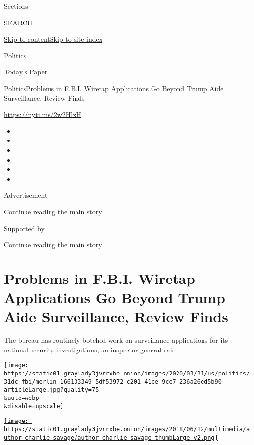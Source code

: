 Sections

SEARCH

\protect\hyperlink{site-content}{Skip to
content}\protect\hyperlink{site-index}{Skip to site index}

\href{https://www.nytimes3xbfgragh.onion/section/politics}{Politics}

\href{https://myaccount.nytimes3xbfgragh.onion/auth/login?response_type=cookie\&client_id=vi}{}

\href{https://www.nytimes3xbfgragh.onion/section/todayspaper}{Today's
Paper}

\href{/section/politics}{Politics}\textbar{}Problems in F.B.I. Wiretap
Applications Go Beyond Trump Aide Surveillance, Review Finds

\url{https://nyti.ms/2w2HlxH}

\begin{itemize}
\item
\item
\item
\item
\item
\item
\end{itemize}

Advertisement

\protect\hyperlink{after-top}{Continue reading the main story}

Supported by

\protect\hyperlink{after-sponsor}{Continue reading the main story}

\hypertarget{problems-in-fbi-wiretap-applications-go-beyond-trump-aide-surveillance-review-finds}{%
\section{Problems in F.B.I. Wiretap Applications Go Beyond Trump Aide
Surveillance, Review
Finds}\label{problems-in-fbi-wiretap-applications-go-beyond-trump-aide-surveillance-review-finds}}

The bureau has routinely botched work on surveillance applications for
its national security investigations, an inspector general said.

\texttt{[image: https://static01.graylady3jvrrxbe.onion/images/2020/03/31/us/politics/31dc-fbi/merlin\_166133349\_5df53972-c201-41ce-9ce7-236a26ed5b90-articleLarge.jpg?quality=75\\\&auto=webp\\\&disable=upscale]}

\href{https://www.nytimes3xbfgragh.onion/by/charlie-savage}{\texttt{[image: https://static01.graylady3jvrrxbe.onion/images/2018/06/12/multimedia/author-charlie-savage/author-charlie-savage-thumbLarge-v2.png]}}

